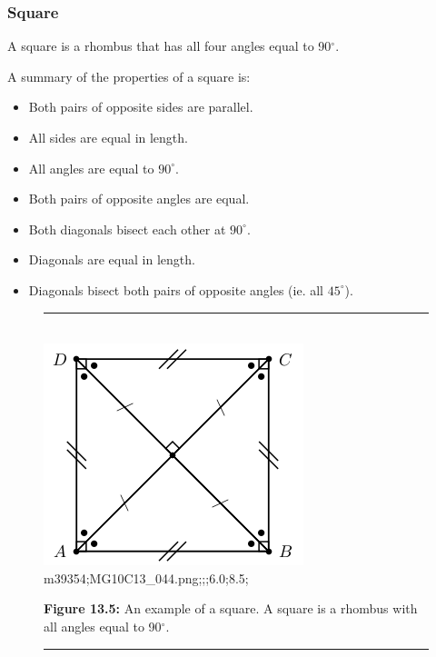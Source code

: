 \subsubsection{ Square}
A square is a rhombus that has all four angles equal to 90$^{\circ }$.\par 
A summary of the properties of a square is:\par 
\begin{itemize}[noitemsep]
\item Both pairs of opposite sides are parallel.
\item All sides are equal in length.
\item All angles are equal to ${90}^{\circ }$.
\item Both pairs of opposite angles are equal.
\item Both diagonals bisect each other at ${90}^{\circ }$.
\item Diagonals are equal in length.
\item Diagonals bisect both pairs of opposite angles (ie. all ${45}^{\circ }$).
\end{itemize}
\setcounter{subfigure}{0}
\begin{figure}[H] %
\begin{center}
\rule[.1in]{\figurerulewidth}{.005in} \\
\label{m39354*uid84!!!underscore!!!media}\label{
m39354*uid84!!!underscore!!!printright
prismsimage}\includegraphics{col11306.imgs/m39354_MG10C13_044.png} %
m39354;MG10C13\_044.png;;;6.0;8.5;
\vspace{2pt}
\vspace{\rubberspace}\par \begin{cnxcaption}
\small \textbf{Figure 13.5: }An example of a square. A square is a rhombus with
all angles equal to 90$^{\circ }$.
\end{cnxcaption}
\vspace{.1in}
\rule[.1in]{\figurerulewidth}{.005in} \\
\end{center}
\end{figure}       

